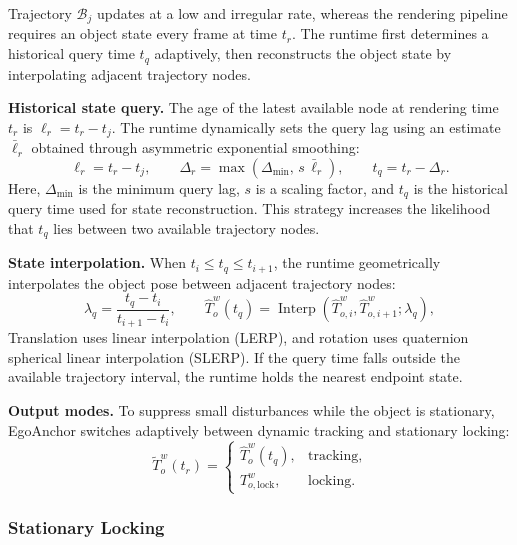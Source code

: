 \documentclass[review]{vgtc}
\begin{document}
Trajectory $\mathcal{B}_j$ updates at a low and irregular rate, whereas the rendering pipeline requires an object state every frame at time $t_r$. The runtime first determines a historical query time $t_q$ adaptively, then reconstructs the object state by interpolating adjacent trajectory nodes.

\textbf{Historical state query.}
The age of the latest available node at rendering time $t_r$ is $\ell_r=t_r-t_j$. The runtime dynamically sets the query lag using an estimate $\bar{\ell}_r$ obtained through asymmetric exponential smoothing:
\begin{equation}
\ell_r = t_r - t_j, \qquad \Delta_r = \max(\Delta_{\min},\, s\,\bar{\ell}_r), \qquad t_q = t_r - \Delta_r.
\label{eq:target-time}
\end{equation}
Here, $\Delta_{\min}$ is the minimum query lag, $s$ is a scaling factor, and $t_q$ is the historical query time used for state reconstruction. This strategy increases the likelihood that $t_q$ lies between two available trajectory nodes.

\textbf{State interpolation.}
When $t_i\leq t_q\leq t_{i+1}$, the runtime geometrically interpolates the object pose between adjacent trajectory nodes:
\begin{equation}
\lambda_q = \frac{t_q - t_i}{t_{i+1} - t_i}, \qquad
\widehat{T}_o^w(t_q) = \operatorname{Interp}(\widehat{T}_{o,i}^{w}, \widehat{T}_{o,i+1}^{w}; \lambda_q),
\label{eq:history-interp}
\end{equation}
Translation uses linear interpolation (LERP), and rotation uses quaternion spherical linear interpolation (SLERP). If the query time falls outside the available trajectory interval, the runtime holds the nearest endpoint state.

\textbf{Output modes.}
To suppress small disturbances while the object is stationary, EgoAnchor switches adaptively between dynamic tracking and stationary locking:
\begin{equation}
\widetilde{T}_o^w(t_r) = \begin{cases}
\widehat{T}_o^w(t_q), & \text{tracking}, \\
T_{o,\mathrm{lock}}^w, & \text{locking}.
\end{cases}
\label{eq:staticlock}
\end{equation}

\subsubsection{Stationary Locking}\label{sec:staticlock}
\end{document}
